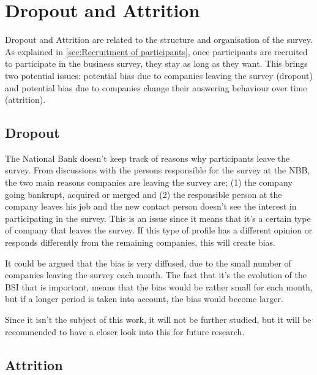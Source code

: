 \documentclass[12pt,a4paper,oneside]{book}
\begin{document}


\section{Dropout and Attrition}

Dropout and Attrition are related to the structure and organisation of the survey. 
As explained in \autoref{sec:Recruitment of participants}, once participants are recruited to participate in the business survey, they stay as long as they want. This brings two potential issues: potential bias due to companies leaving the survey (dropout) and potential bias due to companies change their answering behaviour over time (attrition).

\subsection{Dropout}

The National Bank doesn't keep track of reasons why participants leave the survey. From discussions with the persons responsible for the survey at the NBB, the two main reasons companies are leaving the survey are; (1) the company going bankrupt, acquired or merged and (2) the responsible person at the company leaves his job and the new contact person doesn't see the interest in participating in the survey.
This is an issue since it means that it's a certain type of company that leaves the survey. If this type of profile has a different opinion or responds differently from the remaining companies, this will create bias. 

It could be argued that the bias is very diffused, due to the small number of companies leaving the survey each month. The fact that it's the evolution of the BSI that is important, means that the bias would be rather small for each month, but if a longer period is taken into account, the bias would become larger.

Since it isn't the subject of this work, it will not be further studied, but it will be recommended to have a closer look into this for future research.

\subsection{Attrition}
\end{document}
